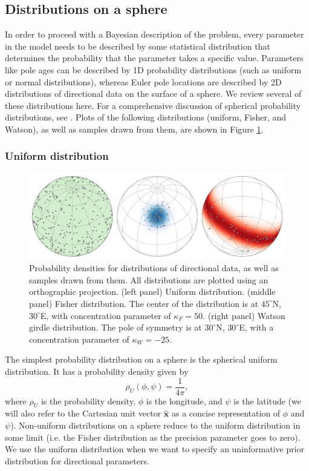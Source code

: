 \documentclass[11pt,letterpaper]{article}
\begin{document}
\subsection*{Distributions on a sphere}

In order to proceed with a Bayesian description of the problem, every parameter in the model needs to be described by some statistical distribution that determines the probability that the parameter takes a specific value. Parameters like pole ages can be described by 1D probability distributions (such as uniform or normal distributions), whereas Euler pole locations are described by 2D distributions of directional data on the surface of a sphere. We review several of these distributions here. For a comprehensive discussion of spherical probability distributions, see \cite{Fisher1987b}. Plots of the following distributions (uniform, Fisher, and Watson), as well as samples drawn from them, are shown in Figure \ref{fig:distributions}. 

\subsubsection*{Uniform distribution}
\begin{figure}
\centering
\includegraphics[width=\textwidth]{fig_direction_distributions.png}
\caption[Spherical probability distributions.]{Probability densities for distributions of directional data, as well as samples drawn from them. All distributions are plotted using an orthographic projection. (left panel) Uniform distribution. (middle panel) Fisher distribution. The center of the distribution is at $45^\circ$N, $30^\circ$E, with concentration parameter of $\kappa_F=50$. (right panel) Watson girdle distribution. The pole of symmetry is at $30^\circ$N, $30^\circ$E, with a concentration parameter of $\kappa_W=-25$.}
\label{fig:distributions}
\end{figure}

The simplest probability distribution on a sphere is the spherical uniform distribution. It has a probability density given by
\begin{equation}
  \rho_U(\phi, \psi) = \frac{1}{4 \pi},
\end{equation}
where $\rho_U$ is the probability density, $\phi$ is the longitude, and $\psi$ is the latitude (we will also refer to the Cartesian unit vector $\hat{\mathbf{x}}$ as a concise representation of $\phi$ and $\psi$). Non-uniform distributions on a sphere reduce to the uniform distribution in some limit (i.e. the Fisher distribution as the precision parameter goes to zero). We use the uniform distribution when we want to specify an uninformative prior distribution for directional parameters.
\end{document}
